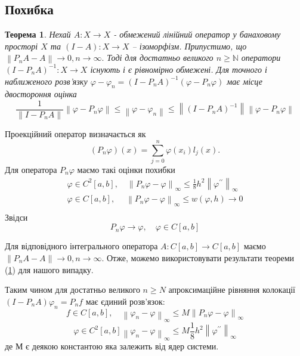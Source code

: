 \documentclass[14pt,a4paper]{extarticle}
\newcounter{e}
\newtheorem{theorem}{Теорема}[section]
\numberwithin{equation}{section}
\begin{document}
 
 \subsection{Похибка}
 
\begin{theorem}
	\label{collocation-error}
	Нехай $A: X \rightarrow X$ - обмежений лінійний оператор у банаховому просторі $X$ та $ (I-A):X \rightarrow X$ -- ізоморфізм. Припустимо, що $\left\|P_{n} A-A\right\| \rightarrow 0, n \rightarrow \infty .$ Тоді для достатньо великого $n \geq \mathbb{N}$ оператори $\left(I-P_{n} A\right)^{-1}: X \rightarrow X$ існують і є рівномірно обмежені. Для точного і наближеного розв'язку $\varphi-\varphi_{n}=\left(I-P_{n} A\right)^{-1}\left(\varphi-P_{n} \varphi\right)$ має місце двостороння оцінка
 \begin{equation}
	 \frac{1}{\left\|I-P_{n} A\right\|}\left\|\varphi-P_{n} \varphi\right\| \leq\left\|\varphi-\varphi_{n}\right\| \leq\left\|\left(I-P_{n} A\right)^{-1}\right\|\left\|\varphi-P_{n} \varphi\right\|
 \end{equation}
\end{theorem} 
Проекційний оператор визначається як
\begin{equation}
 \left(P_{n} \varphi\right)(x)= \sum_{j=0}^{n} \varphi\left(x_{i}\right) l_{j}(x) .
\end{equation}
 Для оператора $P_{n} \varphi$ маємо такі оцінки похибки
 $$
 \begin{array}{l}
 	\displaystyle
	\varphi \in C^{2}[a, b], \quad \left\|P_{n} \varphi-\varphi\right\|_{\infty} \leq \frac{1}{8} h^{2}\left\|\varphi^{\prime \prime}\right\|_{\infty}  
	\\[0.3cm]
 	
 	\displaystyle
	\varphi \in C[a, b], \quad \; \left\|P_{n} \varphi-\varphi\right\|_{\infty} \leq w(\varphi, h) \rightarrow 0
	\\[0.3cm]	
\end{array}
 $$
 Звідси 
 $$ 
 P_{n} \varphi \rightarrow \varphi,  \quad  \varphi \in C[a, b]
 $$
 
 Для відповідного інтегрального оператора $A: C[a, b] \rightarrow C[a, b]$ маємо $\left\|P_{n} A-A\right\| \rightarrow 0, n \rightarrow \infty$.
 Отже, можемо використовувати результати теореми (\ref{collocation-error}) для нашого випадку.

 Таким чином для достатньо великого $n \geq N$ апроксимаційне рівняння колокації $\left(I-P_{n} A\right) \varphi_{n}=P_{n} f$ має єдиний розв'язок:
\begin{equation}
	f \in C[a, b], \quad \left\|\varphi_{n}-\varphi\right\|_{\infty} \leq M\left\|P_{n} \varphi-\varphi\right\|_{\infty}
\end{equation}
\begin{equation}
	\varphi \in C^{2}[a, b]\left\|\varphi_{n}-\varphi\right\|_{\infty} \leq M \frac{1}{8} h^{2}\left\|\varphi^{\prime \prime}\right\|_{\infty}
\end{equation}
де М є деякою константою яка залежить від ядер системи.
\end{document}
